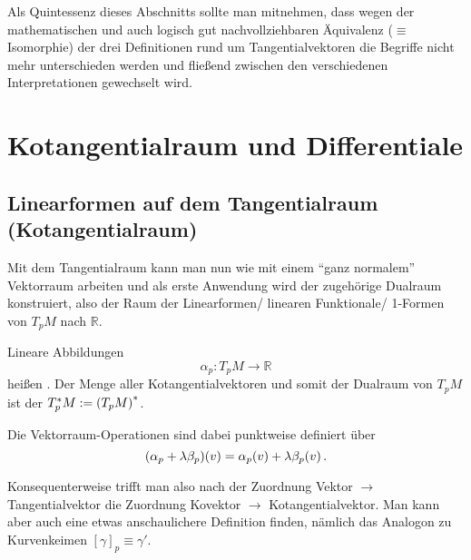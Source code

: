 \documentclass[../H_Analysis_main.tex]{subfiles}
\begin{document}
Als Quintessenz dieses Abschnitts sollte man mitnehmen, dass wegen der mathematischen und auch logisch gut nachvollziehbaren Äquivalenz ($\equiv$ Isomorphie) der drei Definitionen rund um Tangentialvektoren die Begriffe nicht mehr unterschieden werden und fließend zwischen den verschiedenen Interpretationen gewechselt wird.



\newpage


	\section{Kotangentialraum und Differentiale}
		\subsection{Linearformen auf dem Tangentialraum (Kotangentialraum)}
Mit dem Tangentialraum kann man nun wie mit einem \enquote{ganz normalem} Vektorraum arbeiten und als erste Anwendung wird der zugehörige Dualraum konstruiert, also der Raum der Linearformen/ linearen Funktionale/ 1-Formen von $T_p M$ nach $\mathbb{R}$.

\begin{defi}[Kotangentialraum]
Lineare Abbildungen
\begin{equation}
\alpha_p: T_p M \rightarrow \mathbb{R}
\end{equation}
heißen . Der Menge aller Kotangentialvektoren und somit der Dualraum von $T_p M$ ist der  $T^*_p M := \qty(T_p M)^*$.

Die Vektorraum-Operationen sind dabei punktweise definiert über
\begin{equation}
\qty(\alpha_p + \lambda \beta_p)(v) = \alpha_p(v) + \lambda \beta_p(v) \, .
\end{equation}
\end{defi}
Konsequenterweise trifft man also nach der Zuordnung Vektor $\rightarrow$ Tangentialvektor die Zuordnung Kovektor $\rightarrow$ Kotangentialvektor. Man kann aber auch eine etwas anschaulichere Definition finden, nämlich das Analogon zu Kurvenkeimen $[\gamma]_p \equiv \gamma'$.
\end{document}

